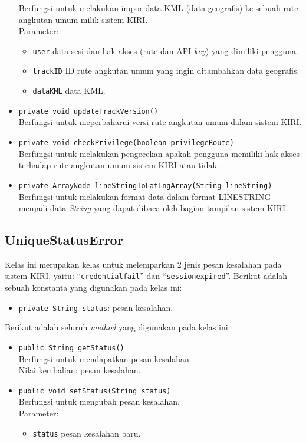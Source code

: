 \begin{itemize}
	Berfungsi untuk melakukan impor data KML (data geografis) ke sebuah rute angkutan umum milik sistem KIRI.\\
	Parameter:
	\begin{itemize}
		\item \texttt{user} data sesi dan hak akses (rute dan API \textit{key}) yang dimiliki pengguna.
		\item \texttt{trackID} ID rute angkutan umum yang ingin ditambahkan data geografis.
		\item \texttt{dataKML} data KML.
	\end{itemize}
	\item \texttt{private void updateTrackVersion()}\\
	Berfungsi untuk meperbaharui versi rute angkutan umum dalam sistem KIRI.
	\item \texttt{private void checkPrivilege(boolean privilegeRoute)}\\
	Berfungsi untuk melakukan pengecekan apakah pengguna memiliki hak akses terhadap rute angkutan umum sistem KIRI atau tidak.
	\item \texttt{private ArrayNode lineStringToLatLngArray(String lineString)}\\
	Berfungsi untuk melakukan format data dalam format LINESTRING menjadi data \textit{String} yang dapat dibaca oleh bagian tampilan sistem KIRI.
\end{itemize}

\subsection{UniqueStatusError}
\label{sec:uniquestatuserror}
Kelas ini merupakan kelas untuk melemparkan 2 jenis pesan kesalahan pada sistem KIRI, yaitu: ``\texttt{credentialfail}'' dan ``\texttt{sessionexpired}''. Berikut adalah sebuah konstanta yang digunakan pada kelas ini:
\begin{itemize}
	\item \texttt{private String status}: pesan kesalahan.
\end{itemize}
Berikut adalah seluruh \textit{method} yang digunakan pada kelas ini:
\begin{itemize}
	\item \texttt{public String getStatus()}\\
	Berfungsi untuk mendapatkan pesan kesalahan.\\
	Nilai kembalian: pesan kesalahan.
	\item \texttt{public void setStatus(String status)}\\
	Berfungsi untuk mengubah pesan kesalahan.\\
	Parameter:
	\begin{itemize}
		\item \texttt{status} pesan kesalahan baru.
	\end{itemize}
\end{itemize}

